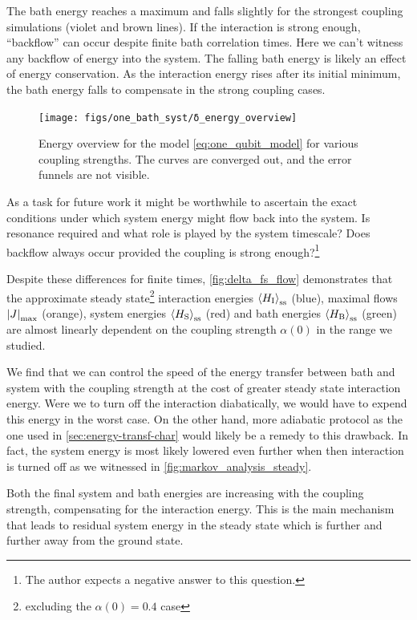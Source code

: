 The bath energy reaches a maximum and falls slightly for the strongest
coupling simulations (violet and brown lines). If the interaction is
strong enough, ``backflow'' can occur despite finite bath correlation
times. Here we can't witness any backflow of energy into the
system. The falling bath energy is likely an effect of energy
conservation. As the interaction energy rises after its initial
minimum, the bath energy falls to compensate in the strong coupling
cases.
\begin{figure}[htp]
  \centering
  \texttt{[image: figs/one\_bath\_syst/δ\_energy\_overview]}
  \caption{\label{fig:delta_energy_overview} Energy overview for the
    model \cref{eq:one_qubit_model} for various coupling
    strengths. The curves are converged out, and the error funnels are
    not visible.}
\end{figure}

As a task for future work it might be worthwhile to ascertain the
exact conditions under which system energy might flow back into the
system. Is resonance required and what role is played by the system
timescale? Does backflow always occur provided the coupling is strong
enough?\footnote{The author expects a negative answer to this
  question.}

Despite these differences for finite times, \cref{fig:delta_fs_flow}
demonstrates that the approximate steady state\footnote{excluding the
  \(α(0)=0.4\) case} interaction energies
\(\ev{H_{\inter}}_{\mathrm{ss}}\) (blue), maximal flows
\(\abs{J}_{\mathrm{max}}\) (orange), system energies
\(\ev{H_{\sys}}_{\mathrm{ss}}\) (red) and bath energies
\(\ev{H_{\bath}}_{\mathrm{ss}}\) (green) are almost linearly dependent
on the coupling strength \(α(0)\) in the range we studied.

We find that we can control the speed of the energy transfer between
bath and system with the coupling strength at the cost of greater
steady state interaction energy. Were we to turn off the interaction
diabatically, we would have to expend this energy in the worst
case. On the other hand, more adiabatic protocol as the one used in
\cref{sec:energy-transf-char} would likely be a remedy to this
drawback. In fact, the system energy is most likely lowered even
further when then interaction is turned off as we witnessed in
\cref{fig:markov_analysis_steady}.

Both the final system and bath energies are increasing with the
coupling strength, compensating for the interaction energy. This is
the main mechanism that leads to residual system energy in the steady
state which is further and further away from the ground state.


